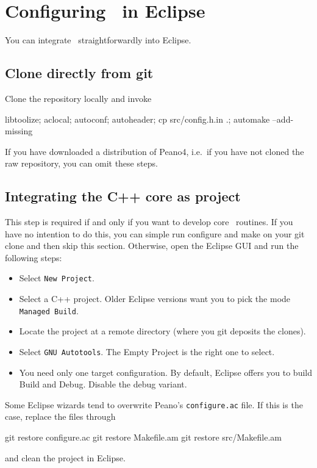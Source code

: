 \chapter{Configuring \Peano\ in Eclipse}


You can integrate \Peano\ straightforwardly into Eclipse. 

\section{Clone directly from git}

Clone
the repository locally and invoke

\begin{bash}
libtoolize; aclocal; 
autoconf; autoheader; 
cp src/config.h.in .; 
automake --add-missing
\end{bash}

\noindent
If you have downloaded a distribution of Peano4,
i.e.~if you have not cloned the raw repository, you can omit these steps.


\section{Integrating the C++ core as project}

This step is required if and only if you want to develop core \Peano\ routines.
If you have no intention to do this, you can simple run configure and make on
your git clone and then skip this section. 
Otherwise, open the Eclipse GUI and run the following steps:

\begin{itemize}
  \item Select \texttt{New Project}.
  \item Select a C++ project. Older Eclipse versions want you to pick the mode \texttt{Managed Build}.
  \item Locate the project at a remote directory (where you git deposits the
  clones).
  \item Select \texttt{GNU Autotools}. The Empty Project is the right one to select.
  \item You need only one target configuration. By default, Eclipse offers you to build Build and Debug. Disable the debug variant.  
\end{itemize}

\noindent
Some Eclipse wizards tend to overwrite Peano's \texttt{configure.ac} file. If
this is the case, replace the files through

\begin{bash}
git restore  configure.ac
git restore  Makefile.am
git restore  src/Makefile.am
\end{bash}

\noindent
and clean the project in Eclipse.


